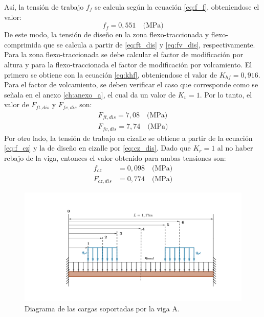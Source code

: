Así, la tensión de trabajo $f_f$ se calcula según la ecuación \ref{eq:f_f}, obteniendose el valor:
\begin{equation}
	f_f = 0,551 \quad \text{(MPa)}
\end{equation}
De este modo, la tensión de diseño en la zona flexo-traccionada y flexo-comprimida que se calcula a partir de \ref{eq:ft_dis} y \ref{eq:fv_dis}, respectivamente. Para la zona flexo-traccionada se debe calcular el factor de modificación por altura y para la flexo-traccionada el factor de modificación por volcamiento. El primero se obtiene con la ecuación \ref{eq:khf}, obteniendose el valor de $K_{hf} = 0,916$. Para el factor de volcamiento, se deben verificar el caso que corresponde como se señala en el anexo \ref{ch:anexo_a}, el cual da un valor de $K_v=1$. Por lo tanto, el valor de $F_{ft,dis}$ y $F_{fv,dis}$ son:
\begin{subequations}
\begin{gather}
	F_{ft,dis} = 7,08 \quad \text{(MPa)}\\
	F_{fv,dis} = 7,74 \quad \text{(MPa)} 
\end{gather}
\end{subequations}
Por otro lado, la tensión de trabajo en cizalle se obtiene a partir de la ecuación \ref{eq:f_cz} y la de diseño en cizalle por \ref{eq:cz_dis}. Dado que $K_r=1$ al no haber rebajo de la viga, entonces el valor obtenido para ambas tensiones son:
\begin{align}
	f_{cz} &= 0,098 \quad \text{(MPa)}\\
	F_{cz,dis} &= 0,774 \quad \text{(MPa)}
\end{align}


\begin{figure}[h]
\centering
\includegraphics[width=1\linewidth,trim={9cm 3cm 5.3cm 3.5cm},clip]{Imagenes/dia_viga_a.pdf}
\caption{Diagrama de las cargas soportadas por la viga A.}
\label{fig:diagcargas_viga_a}
\end{figure}

